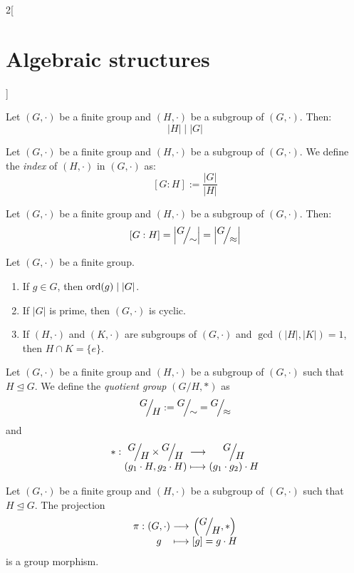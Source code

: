 \documentclass[../../../main_math.tex]{subfiles}
\begin{document}
\begin{multicols}{2}[\section{Algebraic structures}]
\begin{theorem}
    Let $(G,\cdot)$ be a finite group and $(H,\cdot)$ be a subgroup of $(G,\cdot)$. Then: $$|H|\mid|G|$$
  \end{theorem}
  \begin{definition}
    Let $(G,\cdot)$ be a finite group and $(H,\cdot)$ be a subgroup of $(G,\cdot)$. We define the \emph{index} of $(H,\cdot)$ in $(G,\cdot)$ as: $$[G:H]:=\frac{|G|}{|H|}$$
  \end{definition}
  \begin{corollary}
    Let $(G,\cdot)$ be a finite group and $(H,\cdot)$ be a subgroup of $(G,\cdot)$. Then: $$[G:H]=\left|\quot{G}{\sim}\right|=\left|\quot{G}{\approx}\right|$$
  \end{corollary}
  \begin{corollary}
    Let $(G,\cdot)$ be a finite group.
    \begin{enumerate}
      \item If $g\in G$, then $\operatorname{ord}(g)\mid |G|$.
      \item If $|G|$ is prime, then $(G,\cdot)$ is cyclic.
      \item If $(H,\cdot)$ and $(K,\cdot)$ are subgroups of $(G,\cdot)$ and $\gcd(|H|,|K|)=1$, then $H\cap K=\{e\}$.
    \end{enumerate}
  \end{corollary}
  \begin{definition}
    Let $(G,\cdot)$ be a finite group and $(H,\cdot)$ be a subgroup of $(G,\cdot)$ such that $H\unlhd G$. We define the \emph{quotient group} $\left(G/H,*\right)$ as $$\quot{G}{H}:=\quot{G}{\sim}=\quot{G}{\approx}$$ and
    $$\function{*}{\displaystyle\quot{G}{H}\times\quot{G}{H}}{\displaystyle\quot{G}{H}}{(g_1\cdot H,g_2\cdot H)}{(g_1\cdot g_2)\cdot H}$$
  \end{definition}
  \begin{lemma}
    Let $(G,\cdot)$ be a finite group and $(H,\cdot)$ be a subgroup of $(G,\cdot)$ such that $H\unlhd G$. The projection
    $$\function{\pi}{(G,\cdot)}{\displaystyle\left(\quot{G}{H},*\right)}{g}{[g]=g\cdot H}$$
    is a group morphism.
  \end{lemma}

\end{multicols}
\end{document}
